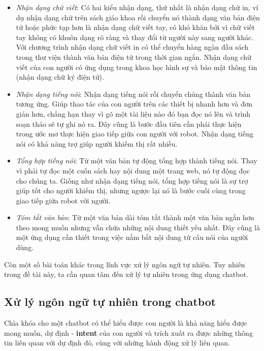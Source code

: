 \documentclass[12pt]{report}
\begin{document}
\begin{itemize}
	\item \textit{Nhận dạng chữ viết}: Có hai kiểu nhận dạng, thứ nhất là nhận dạng chữ in, ví dụ nhận dạng chữ trên sách giáo khoa rồi chuyển nó thành dạng văn bản điện tử hoặc phức tạp hơn là nhận dạng chữ viết tay, có khó khăn bởi vì chữ viết tay không có khuôn dạng rõ ràng và thay đổi từ người này sang người khác. Với chương trình nhận dạng chữ viết in có thể chuyển hàng ngàn đầu sách trong thư viện thành văn bản điện tử trong thời gian ngắn. Nhận dạng chữ viết của con người có ứng dụng trong khoa học hình sự và bảo mật thông tin (nhận dạng chữ ký điện tử).
	\item \textit{Nhận dạng tiếng nói}: Nhận dạng tiếng nói rồi chuyển chúng thành văn bản tương ứng. Giúp thao tác của con người trên các thiết bị nhanh hơn và đơn giản hơn, chẳng hạn thay vì gõ một tài liệu nào đó bạn đọc nó lên và trình soạn thảo sẽ tự ghi nó ra. Đây cũng là bước đầu tiên cần phải thực hiện trong ước mơ thực hiện giao tiếp giữa con người với robot. Nhận dạng tiếng nói có khả năng trợ giúp người khiếm thị rất nhiều.
	\item \textit{Tổng hợp tiếng nói}: Từ một văn bản tự động tổng hợp thành tiếng nói. Thay vì phải tự đọc một cuốn sách hay nội dung một trang web, nó tự động đọc cho chúng ta. Giống như nhận dạng tiếng nói, tổng hợp tiếng nói là sự trợ giúp tốt cho người khiếm thị, nhưng ngược lại nó là bước cuối cùng trong giao tiếp giữa robot với người.
	\item \textit{Tóm tắt văn bản}: Từ một văn bản dài tóm tắt thành một văn bản ngắn hơn theo mong muốn nhưng vẫn chứa những nội dung thiết yếu nhất. Đây cũng là một ứng dụng cần thiết trong việc nắm bắt nội dung từ câu nói của người dùng.
\end{itemize}

Còn một số bài toán khác trong lĩnh vực xử lý ngôn ngữ tự nhiên. Tuy nhiên trong đề tài này, ta cần quan tâm đến xử lý tự nhiên trong ứng dụng chatbot.

\subsection{Xử lý ngôn ngữ tự nhiên trong chatbot}

Chìa khóa cho một chatbot có thể hiểu được con người là khả năng hiểu được mong muốn, dự định - \textbf{intent} của con người và trích xuất ra được những thông tin liên quan với dự định đó, cùng với những hành động xử lý liên quan.
\end{document}
